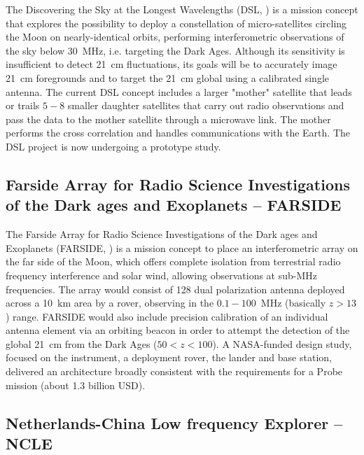 The Discovering the Sky at the Longest Wavelengths (DSL, \cite{chen19}) is a mission concept that explores the possibility to deploy a constellation of micro-satellites circling the Moon on nearly-identical orbits, performing interferometric observations of the sky below 30~MHz, i.e. targeting the Dark Ages. 
Although its sensitivity is insufficient to detect 21~cm fluctuations, its goals will be to accurately image 21~cm foregrounds and to target the 21~cm global using a calibrated single antenna. 
The current DSL concept includes a larger "mother" satellite that leads or trails $5-8$ smaller daughter satellites that carry out radio observations and pass the data to the mother satellite through a microwave link. The mother performs the cross correlation and handles communications with the Earth. 
The DSL project is now undergoing a prototype study.




\subsection{Farside Array for Radio Science Investigations of the Dark ages and Exoplanets -- FARSIDE}

The Farside Array for Radio Science Investigations of the Dark ages and Exoplanets (FARSIDE, \cite{burns19b}) is a mission concept to place an interferometric array on the far side of the Moon, which offers complete isolation from terrestrial radio frequency interference and solar wind, allowing observations at sub-MHz frequencies. The array would consist of 128 dual polarization antenna deployed across a 10~km area by a rover, observing in the $0.1-100$~MHz (basically $z > 13$) range. FARSIDE would also include precision calibration of an individual antenna element via an orbiting beacon in order to attempt the detection of the global 21~cm from the Dark Ages ($50 < z < 100$).
%
A NASA-funded design study, focused on the instrument, a deployment rover, the lander and base station, delivered an architecture broadly consistent with the requirements for a Probe mission (about 1.3 billion USD).


\subsection{Netherlands-China Low frequency Explorer -- NCLE}

